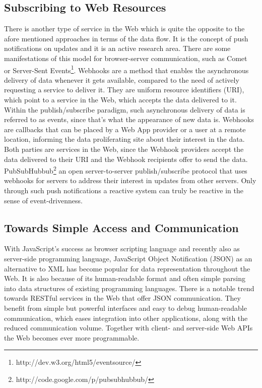 \subsection{Subscribing to Web Resources}
There is another type of service in the Web which is quite the opposite to the afore mentioned approaches in terms of the data flow.
It is the concept of push notifications on updates and it is an active research area.
There are some manifestations of this model for browser-server communication, such as \textrm{Comet}~\cite{5631249} or \textrm{Server-Sent Events}\footnote{http://dev.w3.org/html5/eventsource/}.
\textrm{Webhooks} are a method that enables the asynchronous delivery of data whenever it gets available, compared to the need of actively requesting a service to deliver it.
They are uniform resource identifiers (\textrm{URI}), which point to a service in the Web, which accepts the data delivered to it.
Within the publish/subscribe paradigm, such asynchronous delivery of data is referred to as events, since that's what the appearance of new data is.
\textrm{Webhooks} are callbacks that can be placed by a \textrm{Web App} provider or a user at a remote location, informing the data proliferating site about their interest in the data.
Both parties are services in the Web, since the \textrm{Webhook} providers accept the data delivered to their \textrm{URI} and the \textrm{Webhook} recipients offer to send the data.
\textrm{PubSubHubbub}\footnote{http://code.google.com/p/pubsubhubbub/} an open server-to-server publish/subscribe protocol that uses webhooks for servers to address their interest in updates from other servers.
Only through such push notifications a reactive system can truly be reactive in the sense of event-drivenness.


\subsection{Towards Simple Access and Communication}
With JavaScript's success as browser scripting language and recently also as server-side programming language, JavaScript Object Notification (\textrm{JSON}) as an alternative to \textrm{XML} has become popular for data representation throughout the Web.
It is also because of its human-readable format and often simple parsing into data structures of existing programming languages.
There is a notable trend towards \textrm{RESTful} services in the Web that offer \textrm{JSON} communication.
They benefit from simple but powerful interfaces and easy to debug human-readable communication, which eases integration into other applications, along with the reduced communication volume.
Together with client- and server-side \textrm{Web APIs} the Web becomes ever more programmable.



